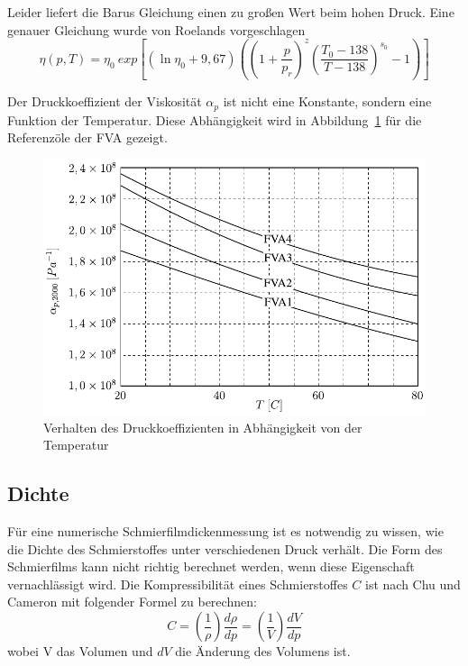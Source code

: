 Leider liefert die Barus Gleichung einen zu großen Wert beim hohen Druck.
Eine genauer Gleichung wurde von Roelands\cite{roelands} vorgeschlagen
\begin{equation}
    \eta(p, T) = \eta_0 \ exp \left[ (\ln{\eta_0} + 9,67)
                              \left( \left( 1 + \frac{p}{p_r} \right) ^z 
                              \left( \frac{T_0 - 138}{T - 138} \right)^{s_0} -1 \right) \right]
    \label{eq:dynamische_viskositaet_druck_roelands}
\end{equation}
%

Der Druckkoeffizient der Viskosität $\alpha_p$ ist nicht eine Konstante, sondern eine Funktion der Temperatur.
Diese Abhängigkeit wird in Abbildung~\ref{fig:druckkoeffizient_temperatur} für die Referenzöle der FVA gezeigt.
\begin{figure}[htb]
    \centering
    \includegraphics[]{./images/visko_druck_koeffizient.pdf}
    \caption{Verhalten des Druckkoeffizienten in Abhängigkeit von der Temperatur}
    \label{fig:druckkoeffizient_temperatur}
\end{figure}
%

\subsection*{Dichte}
\label{sub:dichte}

Für eine numerische Schmierfilmdickenmessung ist es notwendig zu wissen, wie die Dichte des Schmierstoffes unter verschiedenen Druck verhält.
Die Form des Schmierfilms kann nicht richtig berechnet werden, wenn diese Eigenschaft vernachlässigt wird.
Die Kompressibilität eines Schmierstoffes $C$ ist nach Chu und Cameron mit folgender Formel zu berechnen:
\begin{equation}
    \label{eq:kompressibilitaet}
    C = \left( \frac{1}{\rho} \right) \frac{d\rho}{dp} = \left( \frac{1}{V} \right) \frac{dV}{dp}
\end{equation}
%
wobei V das Volumen und $dV$ die Änderung des Volumens ist.

